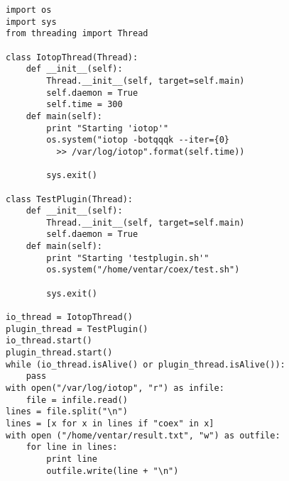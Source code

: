 \label{apx:diskusage}
\begin{lstlisting}
import os
import sys
from threading import Thread

class IotopThread(Thread):
    def __init__(self):
        Thread.__init__(self, target=self.main)
        self.daemon = True
        self.time = 300
    def main(self):
        print "Starting 'iotop'"
        os.system("iotop -botqqqk --iter={0} 
          >> /var/log/iotop".format(self.time))
        
        sys.exit()
        
class TestPlugin(Thread):
    def __init__(self):
        Thread.__init__(self, target=self.main)
        self.daemon = True
    def main(self):
        print "Starting 'testplugin.sh'"
        os.system("/home/ventar/coex/test.sh")
        
        sys.exit()
        
io_thread = IotopThread()
plugin_thread = TestPlugin()
io_thread.start()
plugin_thread.start()
while (io_thread.isAlive() or plugin_thread.isAlive()):
    pass
with open("/var/log/iotop", "r") as infile:
    file = infile.read()
lines = file.split("\n")
lines = [x for x in lines if "coex" in x]
with open ("/home/ventar/result.txt", "w") as outfile:
    for line in lines:
        print line
        outfile.write(line + "\n")
\end{lstlisting}
